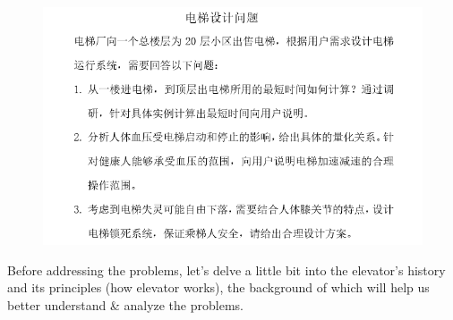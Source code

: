 \begin{figure}[!hb]
		\centering
		\includegraphics[width=0.7\linewidth]{img/problem}
		\caption*{}
		\label{fig:problem}
\end{figure}    
    Before addressing the problems, let's delve a little bit into the 
    elevator's history and its principles (how elevator works), the background 
    of which will help us better understand \& analyze the problems.